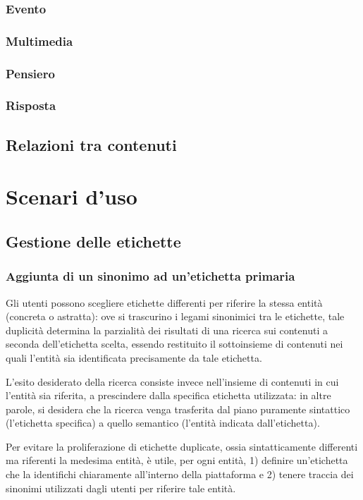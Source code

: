 \documentclass[10pt,a4paper,headinclude,footinclude,hidelinks]{scrreprt} %
\begin{document}
	\subsection{Evento}
	\subsection{Multimedia}
	\subsection{Pensiero}
	\subsection{Risposta}
	\label{sec:stage:cls:contenuti:classi}
	\section{Relazioni tra contenuti}
	\label{sec:stage:cls:contenuti:relazioni}
	
	
	\chapter{Scenari d'uso}
	\label{ch:stage:cls:scenari}
	\section{Gestione delle etichette}
	\label{sec:stage:cls:scenari:etichette}
	\subsection{Aggiunta di un sinonimo ad un'etichetta primaria}
	Gli utenti possono scegliere etichette differenti per riferire la stessa entità (concreta o astratta): ove si trascurino i legami sinonimici tra le etichette, tale duplicità determina la parzialità dei risultati di una ricerca sui contenuti a seconda dell'etichetta scelta, essendo restituito il sottoinsieme di contenuti nei quali l'entità sia identificata precisamente da tale etichetta.

	L'esito desiderato della ricerca consiste invece nell'insieme di contenuti in cui l'entità sia riferita, a prescindere dalla specifica etichetta utilizzata: in altre parole, si desidera che la ricerca venga trasferita dal piano puramente sintattico (l'etichetta specifica) a quello semantico (l'entità indicata dall'etichetta).

	Per evitare la proliferazione di etichette duplicate, ossia sintatticamente differenti ma riferenti la medesima entità, è utile, per ogni entità, 1) definire un'etichetta che la identifichi chiaramente all'interno della piattaforma e 2) tenere traccia dei sinonimi utilizzati dagli utenti per riferire tale entità.
\end{document}
